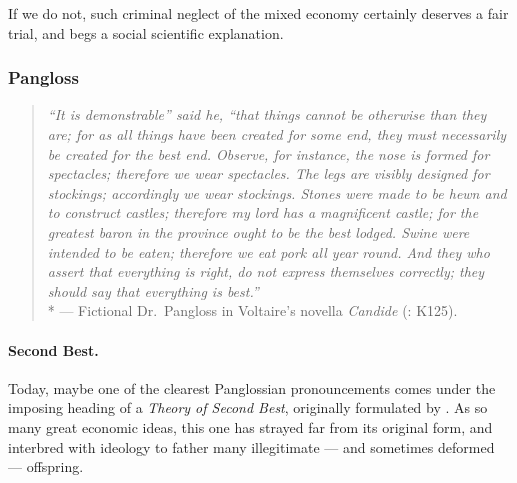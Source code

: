If we do not, such criminal neglect of the mixed economy certainly deserves a fair trial, and begs a social scientific explanation.


\subsubsection{Pangloss} \label{sec:Pangloss}

\begin{quote}
	\emph{``It is demonstrable'' said he, ``that things cannot be otherwise than they are; for as all things have been created for some end, they must necessarily be created for the best end. Observe, for instance, the nose is formed for spectacles; therefore we wear spectacles. The legs are visibly designed for stockings; accordingly we wear stockings. Stones were made to be hewn and to construct castles; therefore my lord has a magnificent castle; for the greatest baron in the province ought to be the best lodged. Swine were intended to be eaten; therefore we eat pork all year round. And they who assert that everything is right, do not express themselves correctly; they should say that everything is best.''}\\*
	--- Fictional Dr.~Pangloss in Voltaire's novella \emph{Candide} (\citeyear{Voltaire1759}: K125).
\end{quote}

\paragraph{Second Best.} Today, maybe one of the clearest Panglossian pronouncements comes under the imposing heading of a \emph{Theory of Second Best}, originally formulated by \cite{Lancaster1956}. As so many great economic ideas, this one has strayed far from its original form, and interbred with ideology to father many illegitimate --- and sometimes  deformed --- offspring.

